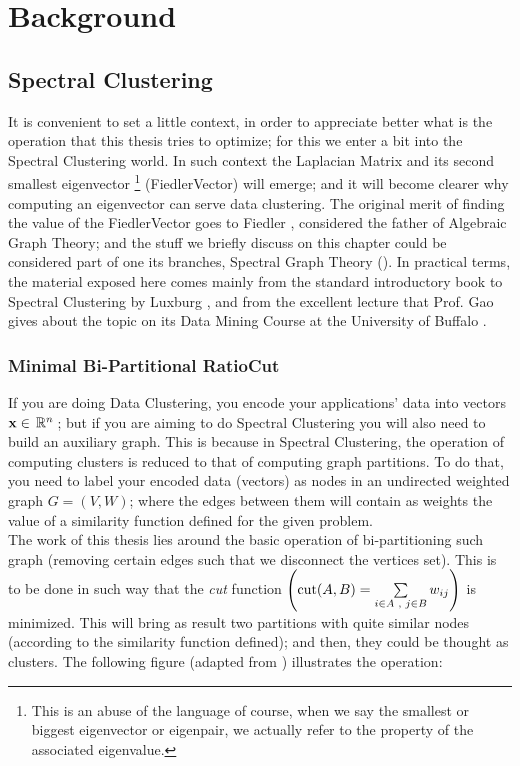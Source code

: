 \chapter{Background}

\section{Spectral Clustering}

It is convenient to set a little context, in order to appreciate
better what is the operation that this thesis tries to optimize; for
this we enter a bit into the Spectral Clustering world. In such
context the \gls{Laplacian} Matrix and its second smallest eigenvector
\footnote{This is an abuse of the language of course, when
we say the smallest or biggest eigenvector or eigenpair, we actually refer to
the property of the associated eigenvalue.}
(\gls{FiedlerVector}) will emerge; and it will become clearer why computing
an eigenvector can serve data clustering. The original merit of
finding the value of the \gls{FiedlerVector} goes to Fiedler
\cite{fiedler73}, considered the father of Algebraic Graph Theory; and
the stuff we briefly discuss on this chapter could be considered part
of one its branches, Spectral Graph Theory (\cite{brouwer12}). In
practical terms, the material exposed here comes mainly from the
standard introductory book to Spectral Clustering by Luxburg \cite{luxburg07},
and from the excellent lecture that Prof. Gao gives about the topic on
its Data Mining Course at the University of Buffalo \cite{gao13}.

\subsection{Minimal Bi-Partitional RatioCut}

If you are doing Data Clustering, you encode your applications' data
into vectors $\mathbf{x} \in \,\mathbb{R}^{n}\,$; but if you are aiming to do Spectral
Clustering you will also need to build an auxiliary graph. This is
because in Spectral Clustering, the operation of computing clusters is
reduced to that of computing graph partitions. To do that, you need to
label your encoded data (vectors) as nodes in an undirected weighted graph $G =
(V,W)$; where the edges between them will contain as weights the value 
of a similarity function defined for the given problem. \\

The work of this thesis lies around the basic operation of
bi-partitioning such graph (removing certain edges such that we
disconnect the vertices set). This is to be done in such way that the
\emph{cut} function $\left(\operatorname{cut}(A,B) = \sum\limits_{\tiny{i \in A
    \ensuremath{\,\,,\,\,} j \in B}} w_{ij}\right)$ is minimized. This will bring as result
two partitions with quite similar nodes (according to the similarity
function defined); and then, they could be thought as clusters. The
following figure (adapted from \cite{gao13}) illustrates the
operation:

